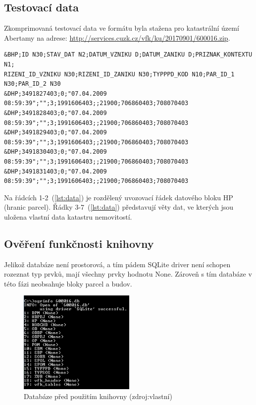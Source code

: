 \subsection{Testovací data}
Zkomprimovaná testovací data ve formátu  byla stažena pro
katastrální území Abertamy na adrese:
\href{http://services.cuzk.cz/vfk/ku/20170901/600016.zip}{http://services.cuzk.cz/vfk/ku/20170901/600016.zip}.
     {\scriptsize
\begin{lstlisting}[caption=Ukázka bloku hranic parcel(HP) -- definice bloků a věty dat(zdroj: vlastní), label=lst:data]
&BHP;ID N30;STAV_DAT N2;DATUM_VZNIKU D;DATUM_ZANIKU D;PRIZNAK_KONTEXTU N1;
RIZENI_ID_VZNIKU N30;RIZENI_ID_ZANIKU N30;TYPPPD_KOD N10;PAR_ID_1 N30;PAR_ID_2 N30
&DHP;3491827403;0;"07.04.2009 08:59:39";"";3;1991606403;;21900;706860403;708070403 
&DHP;3491828403;0;"07.04.2009 08:59:39";"";3;1991606403;;21900;706860403;708070403
&DHP;3491829403;0;"07.04.2009 08:59:39";"";3;1991606403;;21900;706860403;708070403
&DHP;3491830403;0;"07.04.2009 08:59:39";"";3;1991606403;;21900;706860403;708070403
&DHP;3491831403;0;"07.04.2009 08:59:39";"";3;1991606403;;21900;706860403;708070403
\end{lstlisting}}
Na řádcích 1-2~(\ref{lst:data}) je rozdělený uvozovací řádek datového
bloku HP (hranic parcel). Řádky 3-7~(\ref{lst:data}) představují věty
dat, ve kterých jsou uložena vlastní data katastru nemovitostí.

\subsection{Ověření funkčnosti knihovny}
\label{subsec:funkcnost_knihovny}
Jelikož databáze není prostorová, a tím pádem SQLite driver není schopen
rozeznat typ prvků, mají všechny prvky hodnotu None. Zároveň s tím databáze v této fázi
neobsahuje bloky parcel a budov.
\begin{figure}[H]
	 \centering
      \includegraphics[height=5cm]{./pictures/funkcnost_knihovny_pred.png}
      \caption{Databáze před použitím knihovny (zdroj:vlastní)}
      \label{fig:funkcnost_pred}
\end{figure}


